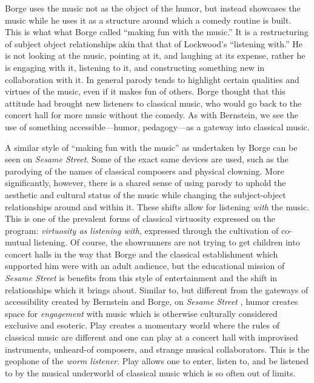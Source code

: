 \documentclass[12pt,letterpaper]{article}
\newcommand{\ses}{\textit{Sesame Street }}
\begin{document}
	Borge uses the music not as the object of the humor, but instead
	showcases the music while he uses it as a structure
	around which a comedy routine is built. 
	This is what what Borge called ``making fun with the music.'' It is a 
	restructuring
	of subject object relationships akin that that of Lockwood's ``listening
	with.'' He is not looking at the music, pointing at it, and laughing at
	its expense, rather he is engaging with it, listening to it, and 
	constructing something new in collaboration with it. In general parody 
	tends to highlight certain qualities and virtues of the music, even if 
	it makes fun of others. Borge thought that this attitude had brought
	new listeners to classical music, who would go back to the concert hall 
	for more music without the comedy.\autocite[256]{Garrett} As with 
	Bernstein, we see the use of something accessible---humor,
	pedagogy---as a gateway into classical music.

	A similar style of ``making fun with the music'' as undertaken by 
	Borge can be seen on \textit{Sesame Street}. Some of the exact same 
	devices are used, such as the parodying of the names of classical 
	composers and physical clowning. More significantly, however, there is 
	a shared sense of using
	parody to uphold the aesthetic and cultural status of the music while
	changing the subject-object relationships around and within it. 
	These shifts allow for listening \textit{with} the music. This is one
	of the prevalent forms
	of classical virtuosity expressed on the program: \textit{virtuosity as 
	listening with}, expressed through the cultivation of co-mutual
	listening. Of course, the showrunners are not trying to
	get children into concert halls in the way that Borge and the
	classical establishment which supported him were with an adult 
	audience, but the educational mission of \ses
	is benefits from this style of entertainment and the shift in 
	relationships which it brings about. Similar to, but different from the
	gateways of
	accessibility created by Bernstein and Borge, on \ses, humor creates 
	space for \textit{engagement} with music which is otherwise culturally
	considered exclusive and esoteric. Play creates a momentary world 
	where the rules of classical music are different and one can play 
	at a concert hall with improvised instruments, unheard-of composers,
	and strange musical collaborators. This is the geophone of the
	\textit{worm listener}. Play allows one to enter, listen to, and be 
	listened to by the musical underworld of classical music which is so 
	often out of limits.
\end{document}
